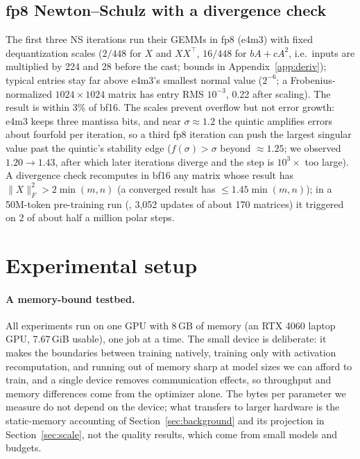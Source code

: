 \documentclass[10pt]{article}
\begin{document}
\subsection{fp8 Newton--Schulz with a divergence check}
\label{sec:fp8}
The first three NS iterations run their GEMMs in fp8 (e4m3) with fixed dequantization scales ($2/448$
for $X$ and $XX^{\top}$, $16/448$ for $bA+cA^2$, i.e.\ inputs are multiplied by 224 and 28 before the cast; bounds in
Appendix~\ref{app:deriv}); typical entries stay far above e4m3's smallest normal value ($2^{-6}$; a Frobenius-normalized
$1024\times1024$ matrix has entry RMS $10^{-3}$, 0.22 after scaling). The result is within 3\% of bf16.
The scales prevent overflow but not error growth: e4m3 keeps three mantissa bits, and near $\sigma\approx1.2$ the quintic
amplifies errors about fourfold per iteration, so a third fp8 iteration can push the largest singular value past the
quintic's stability edge ($f(\sigma)>\sigma$ beyond $\approx1.25$; we observed $1.20\to1.43$, after which later iterations
diverge and the step is $10^3\times$ too large). A divergence check recomputes in bf16 any matrix whose result has
$\|X\|_F^2>2\min(m,n)$ (a converged result has $\le1.45\min(m,n)$); in a 50M-token pre-training run (\lite{}, 3{,}052 updates of
about 170 matrices) it triggered on 2 of about half a million polar steps.

\section{Experimental setup}
\label{sec:setup}
\paragraph{A memory-bound testbed.} All experiments run on one GPU with 8\,GB of memory (an RTX 4060 laptop GPU, 7.67\,GiB
usable), one job at a time. The small device is deliberate: it makes the boundaries between training natively, training only with
activation recomputation, and running out of memory sharp at model sizes we can afford to train, and a single device
removes communication effects, so throughput and memory differences come from the optimizer alone. The bytes per
parameter we measure do not depend on the device; what transfers to larger hardware is the static-memory accounting
of Section~\ref{sec:background} and its projection in Section~\ref{sec:scale}, not the quality results, which come
from small models and budgets.
\end{document}
